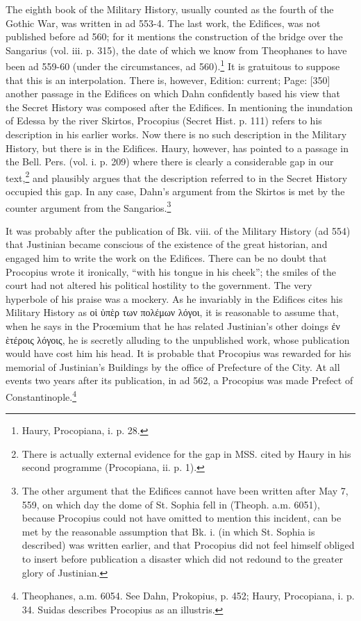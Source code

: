 The eighth book of the Military History, usually counted as the fourth of the Gothic War, was written in ad 553-4. The last work, the Edifices, was not published before ad 560; for it mentions the construction of the bridge over the Sangarius (vol. iii. p. 315), the date of which we know from Theophanes to have been ad 559-60 (under the circumstances, ad 560).\footnote{Haury, Procopiana, i. p. 28.} It is gratuitous to suppose that this is an interpolation. There is, however, Edition: current; Page: [350] another passage in the Edifices on which Dahn confidently based his view that the Secret History was composed after the Edifices. In mentioning the inundation of Edessa by the river Skirtos, Procopius (Secret Hist. p. 111) refers to his description in his earlier works. Now there is no such description in the Military History, but there is in the Edifices. Haury, however, has pointed to a passage in the Bell. Pers. (vol. i. p. 209) where there is clearly a considerable gap in our text,\footnote{There is actually external evidence for the gap in MSS. cited by Haury in his second programme (Procopiana, ii. p. 1).} and plausibly argues that the description referred to in the Secret History occupied this gap. In any case, Dahn\texthebrew{}’s argument from the Skirtos is met by the counter argument from the Sangarios.\footnote{The other argument that the Edifices cannot have been written after May 7, 559, on which day the dome of St. Sophia fell in (Theoph. a.m. 6051), because Procopius could not have omitted to mention this incident, can be met by the reasonable assumption that Bk. i. (in which St. Sophia is described) was written earlier, and that Procopius did not feel himself obliged to insert before publication a disaster which did not redound to the greater glory of Justinian.}

It was probably after the publication of Bk. viii. of the Military History (ad 554) that Justinian became conscious of the existence of the great historian, and engaged him to write the work on the Edifices. There can be no doubt that Procopius wrote it ironically, \texthebrew{“}with his tongue in his cheek\texthebrew{}”; the smiles of the court had not altered his political hostility to the government. The very hyperbole of his praise was a mockery. As he invariably in the Edifices cites his Military History as \textgreek{ο\texthebrew{ἱ ὑ}π\texthebrew{ὲ}ρ των πολέμων λόγοι}, it is reasonable to assume that, when he says in the Proœmium that he has related Justinian\texthebrew{}’s other doings \textgreek{\texthebrew{ἐ}ν \texthebrew{ὲ}τέροις λόγοις}, he is secretly alluding to the unpublished work, whose publication would have cost him his head. It is probable that Procopius was rewarded for his memorial of Justinian\texthebrew{}’s Buildings by the office of Prefecture of the City. At all events two years after its publication, in ad 562, a Procopius was made Prefect of Constantinople.\footnote{Theophanes, a.m. 6054. See Dahn, Prokopius, p. 452; Haury, Procopiana, i. p. 34. Suidas describes Procopius as an illustris.}

